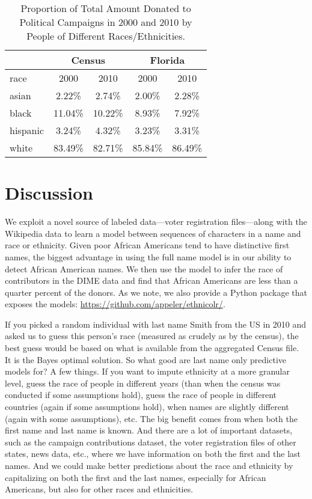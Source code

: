 \documentclass[12pt, letterpaper]{article}
\begin{document}
\begin{table}[h!]
\centering
\caption{Proportion of Total Amount Donated to Political Campaigns in 2000 and 2010 by People of Different Races/Ethnicities.}
\begin{tabular}{ l c c c c}
\hline
         & \multicolumn{2}{c}{Census} & \multicolumn{2}{c}{Florida}\\
\hline
race     &     2000     & 2010     &    2000    & 2010\\    
\hline
asian    &     2.22\%   & 2.74\%   &   2.00\%   & 2.28\%\\
black    &     11.04\%  & 10.22\%  &   8.93\%   & 7.92\%\\
hispanic &     3.24\%   & 4.32\%   &   3.23\%   & 3.31\%\\
white    &     83.49\%  & 82.71\%  &   85.84\%  & 86.49\%\\
\hline
\end{tabular}
\label{table:percentage_contrib_by_race}
\end{table}

\section*{Discussion}
We exploit a novel source of labeled data---voter registration files---along with the Wikipedia data to learn a model between sequences of characters in a name and race or ethnicity. Given poor African Americans tend to have distinctive first names, the biggest advantage in using the full name model is in our ability to detect African American names. We then use the model to infer the race of contributors in the DIME data and find that African Americans are less than a quarter percent of the donors. As we note, we also provide a Python package that exposes the models: \url{https://github.com/appeler/ethnicolr/}.

If you picked a random individual with last name Smith from the US in 2010 and asked us to guess this person's race (measured as crudely as by the census), the best guess would be based on what is available from the aggregated Census file. It is the Bayes optimal solution. So what good are last name only predictive models for? A few things. If you want to impute ethnicity at a more granular level, guess the race of people in different years (than when the census was conducted if some assumptions hold), guess the race of people in different countries (again if some assumptions hold), when names are slightly different (again with some assumptions), etc. The big benefit comes from when both the first name and last name is known. And there are a lot of important datasets, such as the campaign contributions dataset, the voter registration files of other states, news data, etc., where we have information on both the first and the last names. And we could make better predictions about the race and ethnicity by capitalizing on both the first and the last names, especially for African Americans, but also for other races and ethnicities.
\end{document}
